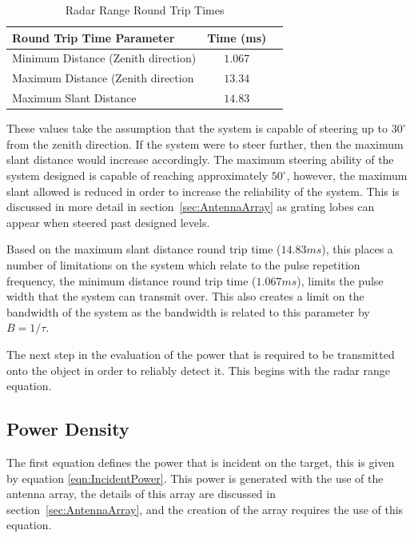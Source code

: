 \documentclass[11pt]{witseiepaper}
\begin{document}
\begin{table}[htb]
    \caption{Radar Range Round Trip Times}
    \label{tab:RadarRangeValues}
    \begin{center}
        \begin{tabular}{p{70mm}cp{70mm}}
            \hline 
            Round Trip Time Parameter & Time (ms) \\
            \hline
            Minimum Distance (Zenith direction) & $1.067$ \\
            Maximum Distance  (Zenith direction & $13.34$ \\
            Maximum Slant Distance & $14.83$ \\
            \hline
        \end{tabular}
    \end{center}
\end{table}
These values take the assumption that the system is capable of steering up to $30^{\circ}$ from the zenith direction. If the system were to steer further, then the maximum slant distance would increase accordingly. The maximum steering ability of the system designed is capable of reaching approximately $50^{\circ}$, however, the maximum slant allowed is reduced in order to increase the reliability of the system. This is discussed in more detail in section~\ref{sec:AntennaArray} as grating lobes can appear when steered past designed levels.

Based on the maximum slant distance round trip time ($14.83 ms$), this places a number of limitations on the system which relate to the pulse repetition frequency, the minimum distance round trip time ($1.067 ms$), limits the pulse width that the system can transmit over. This also creates a limit on the bandwidth of the system as the bandwidth is related to this parameter by $B = 1/ \tau$.


The next step in the evaluation of the power that is required to be transmitted onto the object in order to reliably detect it. This begins with the radar range equation.

\subsection{Power Density} \label{sec:PowerDensity}

The first equation defines the power that is incident on the target, this is given by equation \ref{eqn:IncidentPower}. This power is generated with the use of the antenna array, the details of this array are discussed in section~\ref{sec:AntennaArray}, and the creation of the array requires the use of this equation. 
\end{document}
